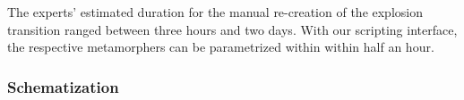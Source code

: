 The experts' estimated duration for the manual re-creation of the explosion transition ranged between three hours and two days. With our scripting interface, the respective metamorphers can be parametrized within within half an hour.


\vspace{-5pt}

\subsubsection{Schematization}









